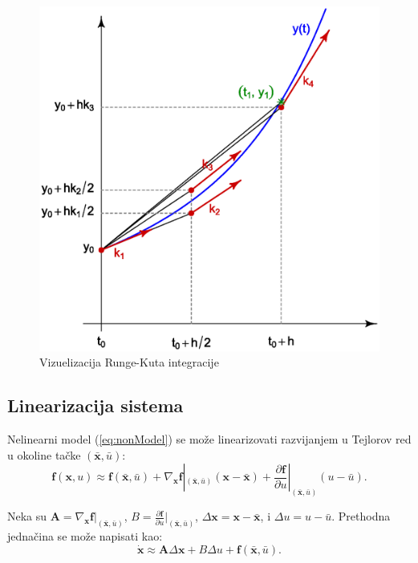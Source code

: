 \documentclass[a4paper,11pt]{article}
\theoremstyle{definition} \newtheorem{deff}{Definicija}[section]
\theoremstyle{definition} \newtheorem{prim}[deff]{Primer}
\theoremstyle{plain} \newtheorem{teor}[deff]{Teorema}
\newcommand{\vect}[1]{\boldsymbol{\mathbf{#1}}}
\begin{document}
	
	
	
	\begin{figure}[!htb]
		\centering
			\includegraphics[width=0.45\linewidth]{slike/Runge_Kutta_slopes.eps}
			\caption{}
			\label{fig:RK4}
		
		\caption{Vizuelizacija Runge-Kuta integracije \cite{rk4}}
	\end{figure}
	
	
	
	
	
	
	\clearpage
	
	
	
	
	\subsection{Linearizacija sistema}
	\label{sec:linearizacija}
	
	Nelinearni model (\ref{eq:nonModel}) se može linearizovati razvijanjem u Tejlorov red u okoline tačke $(\vect{\bar{x}}, \bar{u})$:
	\begin{equation}
		\mathbf{f}(\mathbf{x}, u) \approx \mathbf{f}(\mathbf{\bar{x}}, \bar{u}) + \nabla_{\vect{x}} \mathbf{f}|_{(\vect{\bar{x}},\bar{u})} (\mathbf{x} - \mathbf{\bar{x}}) + \frac{\partial \mathbf{f}}{\partial u}|_{(\mathbf{\bar{x}},\bar{u})} (u - \bar{u}). \label{eq:linearization}
	\end{equation}
	
	Neka su $\vect{A} = \nabla_{\mathbf{x}} \mathbf{f}|_{(\bar{\mathbf{x}},\bar{u})}$, $B = \frac{\partial \mathbf{f}}{\partial u}|_{(\bar{\mathbf{x}},\bar{u})}$, $\Delta \mathbf{x} = \mathbf{x} - \bar{\mathbf{x}}$, i $\Delta u = u - \bar{u}$.
	Prethodna jednačina se može napisati kao:
	\begin{equation}
		\dot{\mathbf{x}} \approx \vect{A}\Delta \mathbf{x} + B\Delta u + \vect{f}(\bar{\mathbf{x}}, \bar{u}). \label{eq:linearized_system}
	\end{equation}
	
\end{document}
